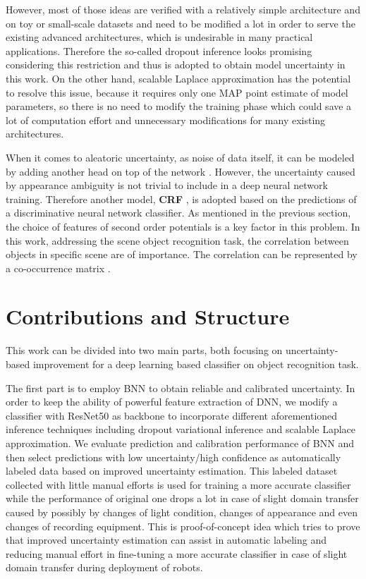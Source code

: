 However, most of those ideas are verified with a relatively simple architecture and on toy or small-scale datasets and need to be modified a lot in order to serve the existing advanced architectures, which is undesirable in many practical applications. Therefore the so-called dropout inference\cite{gal2016dropout} looks promising considering this restriction and thus is adopted to obtain model uncertainty in this work. On the other hand, scalable Laplace approximation \cite{ritter2018scalable} has the potential to resolve this issue, because it requires only one MAP point estimate of model parameters, so there is no need to modify the training phase which could save a lot of computation effort and unnecessary modifications for many existing architectures.

When it comes to aleatoric uncertainty, as noise of data itself, it can be modeled by adding another head on top of the network \cite{kendall2017uncertainties}. However, the uncertainty caused by appearance ambiguity is not trivial to include in a deep neural network training. Therefore another model, \textbf{\gls{CRF}}
\cite{lafferty2001conditional}, is adopted based on the predictions of a discriminative neural network classifier. As mentioned in the previous section, the choice of features of second order potentials is a key factor in this problem. In this work, addressing the scene object recognition task, the correlation between objects in specific scene are of importance. The correlation can be represented by a co-occurrence matrix \cite{ladicky2010graph}\cite{rasiwasia2009holistic}\cite{galleguillos2008object}\cite{rabinovich2007objects}.

\section{Contributions and Structure}
This work can be divided into two main parts, both focusing on uncertainty-based improvement for a deep learning based classifier on object recognition task. 

The first part is to employ \gls{BNN} to obtain reliable and calibrated uncertainty. In order to keep the ability of powerful feature extraction of DNN, we modify a classifier with ResNet50\cite{he2016deep} as backbone to incorporate different aforementioned inference techniques including dropout variational inference and scalable Laplace approximation. We evaluate prediction and calibration performance of \gls{BNN} and then select predictions with low uncertainty/high confidence as automatically labeled data based on improved uncertainty estimation. This labeled dataset collected with little manual efforts is used for training a more accurate classifier while the performance of original one drops a lot in case of slight domain transfer caused by possibly by changes of light condition, changes of appearance and even changes of recording equipment. This is proof-of-concept idea which tries to prove that improved uncertainty estimation can assist in automatic labeling and reducing manual effort in fine-tuning a more accurate classifier in case of slight domain transfer during deployment of robots. 

